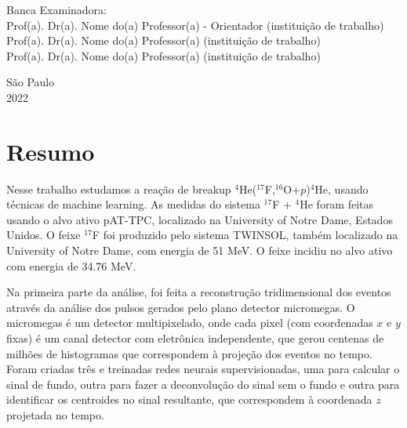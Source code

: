 \documentclass[a4paper,12pt,oneside]{book}
\begin{document}
\par
\leftskip 6cm
\par
\leftskip 0cm
\vskip 2cm


\noindent Banca Examinadora: \\
\noindent Prof(a). Dr(a). Nome do(a) Professor(a) - Orientador (institui\c{c}\~{a}o de trabalho) \\
Prof(a). Dr(a). Nome do(a) Professor(a) (institui\c{c}\~{a}o de trabalho) \\
Prof(a). Dr(a). Nome do(a) Professor(a) (institui\c{c}\~{a}o de trabalho) \\
\vspace{1.8cm}


\begin{center}
    {S\~ao Paulo \\  2022}
\end{center}%
    
\clearpage

\chapter*{Resumo}

\par Nesse trabalho estudamos a reação de breakup $^4$He($^{17}$F,$^{16}$O+$p$)$^4$He, usando técnicas de machine learning. As medidas do sistema $^{17}$F + $^4$He foram feitas usando o alvo ativo pAT-TPC, localizado na University of Notre Dame, Estados Unidos. O feixe $^{17}$F foi produzido pelo sistema TWINSOL, também localizado na University of Notre Dame, com energia de 51 MeV. O feixe incidiu no alvo ativo com energia de 34.76 MeV.

\par Na primeira parte da análise, foi feita a reconstrução tridimensional dos eventos através da análise dos pulsos gerados pelo plano detector micromegas. O micromegas é um detector multipixelado, onde cada pixel (com coordenadas $x$ e $y$ fixas) é um canal detector com eletrônica independente, que gerou centenas de milhões de histogramas que correspondem à projeção dos eventos no tempo. Foram criadas três e treinadas redes neurais supervisionadas, uma para calcular o sinal de fundo, outra para fazer a deconvolução do sinal sem o fundo e outra para identificar os centroides no sinal resultante, que correspondem à coordenada $z$ projetada no tempo.
\end{document}
